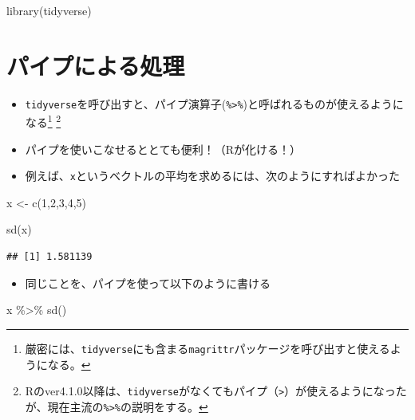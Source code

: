 \documentclass[
]{book}
\newenvironment{Shaded}{\begin{snugshade}}{\end{snugshade}}
\newcommand{\DecValTok}[1]{\textcolor[rgb]{0.00,0.00,0.81}{#1}}
\newcommand{\FunctionTok}[1]{\textcolor[rgb]{0.00,0.00,0.00}{#1}}
\newcommand{\NormalTok}[1]{#1}
\newcommand{\OtherTok}[1]{\textcolor[rgb]{0.56,0.35,0.01}{#1}}
\newcommand{\SpecialCharTok}[1]{\textcolor[rgb]{0.00,0.00,0.00}{#1}}
\providecommand{\tightlist}{%
  \setlength{\itemsep}{0pt}\setlength{\parskip}{0pt}}
\begin{document}
\begin{Shaded}
\begin{Highlighting}[]
\FunctionTok{library}\NormalTok{(tidyverse)}
\end{Highlighting}
\end{Shaded}

\hypertarget{ux30d1ux30a4ux30d7ux306bux3088ux308bux51e6ux7406}{%
\section{パイプによる処理}\label{ux30d1ux30a4ux30d7ux306bux3088ux308bux51e6ux7406}}

\begin{itemize}
\tightlist
\item
  \texttt{tidyverse}を呼び出すと、パイプ演算子(\texttt{\%\textgreater{}\%})と呼ばれるものが使えるようになる\footnote{厳密には、\texttt{tidyverse}にも含まる\texttt{magrittr}パッケージを呼び出すと使えるようになる。} \footnote{Rのver4.1.0以降は、\texttt{tidyverse}がなくてもパイプ（\texttt{\textbar{}\textgreater{}}）が使えるようになったが、現在主流の\texttt{\%\textgreater{}\%}の説明をする。}
\item
  パイプを使いこなせるととても便利！（Rが化ける！）
\item
  例えば、\texttt{x}というベクトルの平均を求めるには、次のようにすればよかった
\end{itemize}

\begin{Shaded}
\begin{Highlighting}[]
\NormalTok{x }\OtherTok{\textless{}{-}} \FunctionTok{c}\NormalTok{(}\DecValTok{1}\NormalTok{,}\DecValTok{2}\NormalTok{,}\DecValTok{3}\NormalTok{,}\DecValTok{4}\NormalTok{,}\DecValTok{5}\NormalTok{)}

\FunctionTok{sd}\NormalTok{(x)}
\end{Highlighting}
\end{Shaded}

\begin{verbatim}
## [1] 1.581139
\end{verbatim}

\begin{itemize}
\tightlist
\item
  同じことを、パイプを使って以下のように書ける
\end{itemize}

\begin{Shaded}
\begin{Highlighting}[]
\NormalTok{x }\SpecialCharTok{\%\textgreater{}\%} \FunctionTok{sd}\NormalTok{()}
\end{Highlighting}
\end{Shaded}
\end{document}
